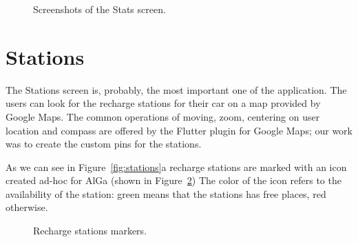 \begin{figure}[H]
    \quad
    \caption{Screenshots of the Stats screen.}
    \label{fig:stats}
\end{figure}

\section{Stations}
The Stations screen is, probably, the most important one of the application. The users can look for the recharge stations for their car on a map provided by Google Maps.
The common operations of moving, zoom, centering on user location and compass are offered by the Flutter plugin for Google Maps; our work was to create the custom pins for the stations.

As we can see in Figure~\ref{fig:stations}a recharge stations are marked with an icon created ad-hoc for AlGa (shown in Figure~\ref{fig:stations_markers}) The color of the icon refers to the availability of the station: green means that the stations has free places, red otherwise.

\begin{figure}[H]
    \centering
    \quad
    \quad
    \caption{Recharge stations markers.}
    \label{fig:stations_markers}
\end{figure}

